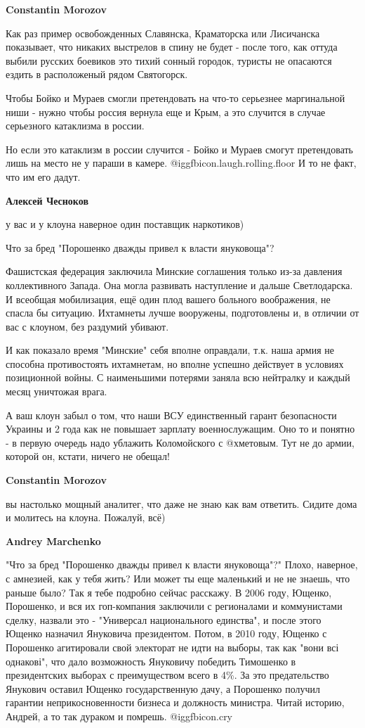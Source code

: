 \begin{itemize}
\begin{itemize}
\textbf{Constantin Morozov} 

Как раз пример освобожденных Славянска, Краматорска или Лисичанска показывает,
что никаких выстрелов в спину не будет - после того, как оттуда выбили русских
боевиков это тихий сонный городок, туристы не опасаются ездить в расположеный
рядом Святогорск.

Чтобы Бойко и Мураев смогли претендовать на что-то серьезнее маргинальной ниши
- нужно чтобы россия вернула еще и Крым, а это случится в случае серьезного
катаклизма в россии.

Но если это катаклизм в россии случится - Бойко и Мураев смогут претендовать
лишь на место не у параши в камере.  @igg{fbicon.laugh.rolling.floor}  И то не факт, что им его дадут.

\textbf{Алексей Чесноков} 

у вас и у клоуна наверное один поставщик наркотиков)

Что за бред "Порошенко дважды привел к власти януковоща"?

Фашистская федерация заключила Минские соглашения только из-за давления
коллективного Запада. Она могла развивать наступление и дальше Светлодарска. И
всеобщая мобилизация, ещё один плод вашего больного воображения, не спасла бы
ситуацию. Ихтамнеты лучше вооружены, подготовлены и, в отличии от вас с
клоуном, без раздумий убивают.

И как показало время "Минские" себя вполне оправдали, т.к. наша армия не
способна противостоять ихтамнетам, но вполне успешно действует в условиях
позиционной войны. С наименьшими потерями заняла всю нейтралку и каждый месяц
уничтожая врага.

А ваш клоун забыл о том, что наши ВСУ единственный гарант безопасности Украины
и 2 года как не повышает зарплату военнослужащим. Оно то и понятно - в первую
очередь надо ублажить Коломойского с @хметовым. Тут не до армии, которой он,
кстати, ничего не обещал!


\textbf{Constantin Morozov} 

вы настолько мощный аналитег, что даже не знаю как вам ответить. Сидите дома и
молитесь на клоуна. Пожалуй, всё)

\textbf{Andrey Marchenko} 

"Что за бред "Порошенко дважды привел к власти януковоща"?" Плохо, наверное, с
амнезией, как у тебя жить? Или может ты еще маленький и не не знаешь, что
раньше было? Так я тебе подробно сейчас расскажу. В 2006 году, Ющенко,
Порошенко, и вся их гоп-компания заключили с регионалами и коммунистами сделку,
назвали это - "Универсал национального единства", и после этого Ющенко назначил
Януковича президентом. Потом, в 2010 году, Ющенко с Порошенко агитировали свой
электорат не идти на выборы, так как "вони всі однакові", что дало возможность
Януковичу победить Тимошенко в президентских выборах с преимуществом всего в
4\%. За это предательство Янукович оставил Ющенко государственную дачу, а
Порошенко получил гарантии неприкосновенности бизнеса и должность министра.
Читай историю, Андрей, а то так дураком и помрешь.  @igg{fbicon.cry} 


\end{itemize}
\end{itemize}
